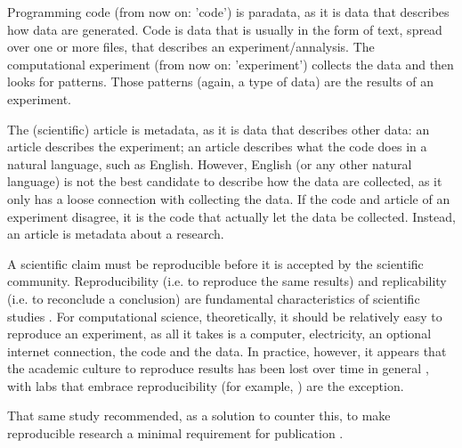 
Programming code (from now on: 'code') is paradata, 
as it is data that describes how data are generated.
Code is data that is usually in the form of text, 
spread over one or more files, that describes an experiment/annalysis.
The computational experiment (from now on: 'experiment') collects the data
and then looks for patterns.
Those patterns (again, a type of data) are the results of an experiment.

The (scientific) article is metadata, as it is data that describes other data:
an article describes the
experiment; an article describes what the code does in a natural 
language, such as English.
However, English (or any other natural language) is not the best
candidate to describe how the data are collected,
as it only has a loose connection with collecting the data.
If the code and article of an experiment disagree,
it is the code that actually let the data be collected.  
Instead, an article is metadata about a research.


A scientific claim must be reproducible before it is accepted
by the scientific community.
Reproducibility (i.e. to reproduce the same results) 
and replicability (i.e. to reconclude a conclusion)
are fundamental characteristics of scientific studies \cite{patil2019visual}.
For computational science, theoretically, it should be relatively easy to 
reproduce an experiment, as all it takes is a computer, electricity,
an optional internet connection, the code and the data.
In practice, however, it appears that 
the academic culture to reproduce results 
has been lost over time in general \cite{peng2011reproducible},
with labs that embrace reproducibility (for example, \cite{barba2016hard})
are the exception.

That same study recommended, as a solution to counter this, 
to make reproducible research a minimal requirement for 
publication \cite{peng2011reproducible}.


